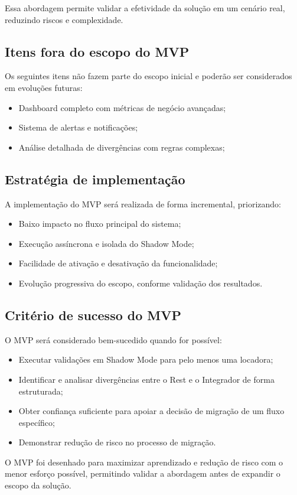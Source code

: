 Essa abordagem permite validar a efetividade da solução em um cenário real, reduzindo riscos e complexidade.

\subsection{Itens fora do escopo do MVP}
Os seguintes itens não fazem parte do escopo inicial e poderão ser considerados em evoluções futuras:
\begin{itemize}
    \item Dashboard completo com métricas de negócio avançadas;
    \item Sistema de alertas e notificações;
    \item Análise detalhada de divergências com regras complexas;
\end{itemize}

\subsection{Estratégia de implementação}
A implementação do MVP será realizada de forma incremental, priorizando:
\begin{itemize}
    \item Baixo impacto no fluxo principal do sistema;
    \item Execução assíncrona e isolada do Shadow Mode;
    \item Facilidade de ativação e desativação da funcionalidade;
    \item Evolução progressiva do escopo, conforme validação dos resultados.
\end{itemize}

\subsection{Critério de sucesso do MVP}
O MVP será considerado bem-sucedido quando for possível:
\begin{itemize}
    \item Executar validações em Shadow Mode para pelo menos uma locadora;
    \item Identificar e analisar divergências entre o Rest e o Integrador de forma estruturada;
    \item Obter confiança suficiente para apoiar a decisão de migração de um fluxo específico;
    \item Demonstrar redução de risco no processo de migração.
\end{itemize}

O MVP foi desenhado para maximizar aprendizado e redução de risco com o menor esforço possível, permitindo validar a abordagem antes de expandir o escopo da solução.
